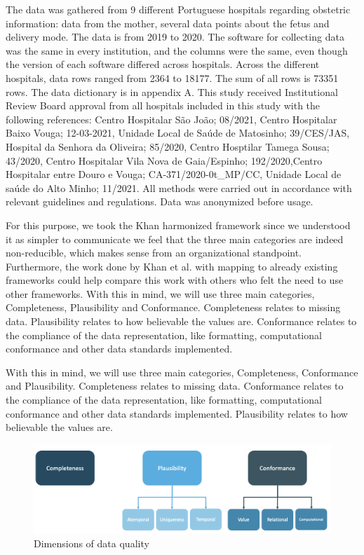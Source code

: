 
The data was gathered from 9 different Portuguese hospitals regarding obstetric information: data from the mother, several data points about the fetus and delivery mode. The data is from 2019 to 2020. The software for collecting data was the same in every institution, and the columns were the same, even though the version of each software differed across hospitals. Across the different hospitals, data rows ranged from 2364 to 18177. The sum of all rows is 73351 rows. The data dictionary is in appendix A. This study received Institutional Review Board approval from all hospitals included in this study with the following references: Centro Hospitalar São João; 08/2021, Centro Hospitalar Baixo Vouga; 12-03-2021, Unidade Local de Saúde de Matosinho; 39/CES/JAS, Hospital da Senhora da Oliveira; 85/2020, Centro Hosptilar Tamega Sousa; 43/2020, Centro Hospitalar Vila Nova de Gaia/Espinho; 192/2020,Centro Hospitalar entre Douro e Vouga; CA-371/2020-0t\_MP/CC, Unidade Local de sa\'{u}de do Alto Minho; 11/2021. All methods were carried out in accordance with relevant guidelines and regulations. Data was anonymized before usage.

For this purpose, we took the Khan harmonized framework since we understood it as simpler to communicate we feel that the three main categories are indeed non-reducible, which makes sense from an organizational standpoint. Furthermore, the work done by Khan et al. with mapping to already existing frameworks could help compare this work with others who felt the need to use other frameworks. With this in mind, we will use three main categories, Completeness, Plausibility and Conformance. Completeness relates to missing data. Plausibility relates to how believable the values are. Conformance relates to the compliance of the data representation, like formatting, computational conformance and other data standards implemented. 

With this in mind, we will use three main categories, Completeness, Conformance and Plausibility. Completeness relates to missing data. Conformance relates to the compliance of the data representation, like formatting, computational conformance and other data standards implemented. Plausibility relates to how believable the values are.

\begin{figure}[htbp]
\centering
\caption{Dimensions of data quality}\label{fig:categories} 
\includegraphics[scale=0.29]{figures/data-quality-v1.png}
\end{figure}
